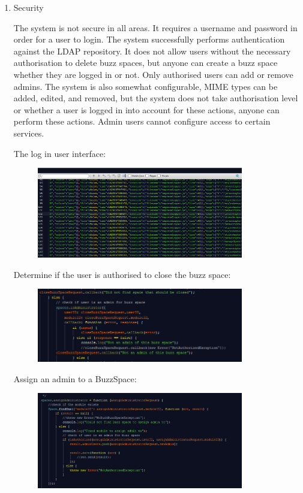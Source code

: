 \documentclass[hidelinks, 12pt, oneside]{article}
\begin{document}
\begin{enumerate}
\item Security 

The system is not secure in all areas. It requires a username and password in order for a user to login. The system successfully performs authentication against the LDAP repository. It does not allow users without the necessary authorisation to delete buzz spaces, but anyone can create a buzz space whether they are logged in or not. Only authorised users can add or remove admins. The system is also somewhat configurable, MIME types can be added, edited, and removed, but the system does not take authorisation level or whether a user is logged in into account for these actions, anyone can perform these actions. Admin users cannot configure access to certain services.

The log in user interface:

\begin{figure}[h!]
  \centering
    \includegraphics[width=0.85\textwidth]{logFile} 
\end{figure}

Determine if the user is authorised to close the buzz space:


\begin{figure}[h!]
  \centering
    \includegraphics[width=0.85\textwidth]{closeBuzzSpace} 
\end{figure}

Assign an admin to a BuzzSpace:


\begin{figure}[h!]
  \centering
    \includegraphics[width=0.85\textwidth]{addAdmin} 
\end{figure}



\end{enumerate}
\end{document}
